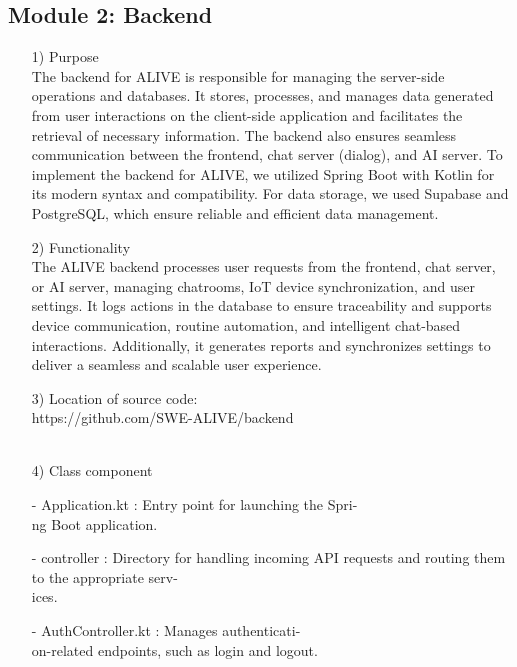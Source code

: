 \documentclass[conference]{IEEEtran}
\begin{document}
\subsection{Module 2: Backend}
\begin{enumerate}
    \item[1)] Purpose\\
    The backend for ALIVE is responsible for managing the server-side operations and databases. It stores, processes, and manages data generated from user interactions on the client-side application and facilitates the retrieval of necessary information. The backend also ensures seamless communication between the frontend, chat server (dialog), and AI server. To implement the backend for ALIVE, we utilized Spring Boot with Kotlin for its modern syntax and compatibility. For data storage, we used Supabase and PostgreSQL, which ensure reliable and efficient data management. \\
    \item[2)] Functionality\\
    The ALIVE backend processes user requests from the frontend, chat server, or AI server, managing chatrooms, IoT device synchronization, and user settings. It logs actions in the database to ensure traceability and supports device communication, routine automation, and intelligent chat-based interactions. Additionally, it generates reports and synchronizes settings to deliver a seamless and scalable user experience. \\
    
    \item[3)] Location of source code:\\ https://github.com/SWE-ALIVE/backend \\ \\
    
    \item[4)] Class component
        \item[-] Application.kt : Entry point for launching the Spri-\\ng Boot application. \\
        
        \item[-] controller : Directory for handling incoming API requests and routing them to the appropriate serv-\\ices.\\
        
        \item[-] AuthController.kt : Manages authenticati-\\on-related endpoints, such as login and logout.\\
        

\end{enumerate}
\end{document}
